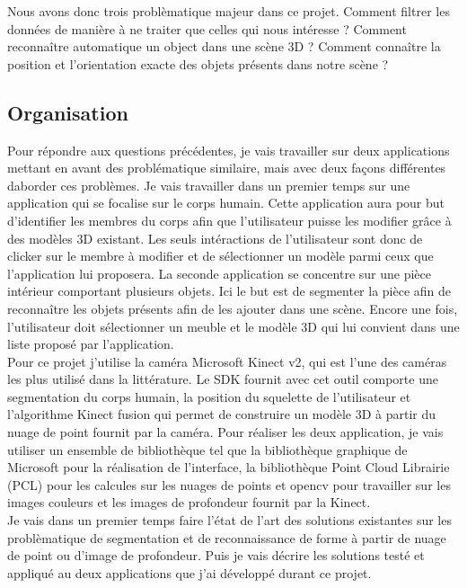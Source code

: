 Nous avons donc trois problèmatique majeur dans ce projet. Comment filtrer les données de manière à ne traiter que celles qui nous
intéresse ? Comment reconnaître automatique un object dans une scène 3D ? Comment connaître la position et l'orientation exacte des objets 
présents dans notre scène ?

\subsection{Organisation}

Pour répondre aux questions précédentes, je vais travailler sur deux applications mettant en avant des problématique similaire,
mais avec deux façons différentes daborder ces problèmes. Je vais travailler dans un premier temps sur une application qui se focalise
sur le corps humain. Cette application aura pour but d'identifier les membres du corps afin que l'utilisateur puisse les modifier
grâce à des modèles 3D existant. Les seuls intéractions de l'utilisateur sont donc de clicker sur le membre à modifier et de sélectionner
un modèle parmi ceux que l'application lui proposera. La seconde application se concentre sur une pièce intérieur comportant plusieurs
objets. Ici le but est de segmenter la pièce afin de reconnaître les objets présents afin de les ajouter dans une scène. Encore une fois,
l'utilisateur doit sélectionner un meuble et le modèle 3D qui lui convient dans une liste proposé par l'application.\\

Pour ce projet j'utilise la caméra Microsoft Kinect v2, qui est l'une des caméras les plus utilisé dans la littérature. Le SDK fournit
avec cet outil comporte une segmentation du corps humain, la position du squelette de l'utilisateur et l'algorithme Kinect fusion qui
permet de construire un modèle 3D à partir du nuage de point fournit par la caméra.
Pour réaliser les deux application, je vais utiliser un ensemble de bibliothèque tel que la bibliothèque graphique de Microsoft pour
la réalisation de l'interface, la bibliothèque \og Point Cloud Librairie \fg\cite{PCL}(PCL) pour les calcules sur les nuages de points et 
opencv pour travailler sur les images couleurs et les images de profondeur fournit par la Kinect.\\

Je vais dans un premier temps faire l'état de l'art des solutions existantes sur les problèmatique de segmentation et de reconnaissance de
forme à partir de nuage de point ou d'image de profondeur. Puis je vais décrire les solutions testé et appliqué au deux applications que j'ai
développé durant ce projet.
